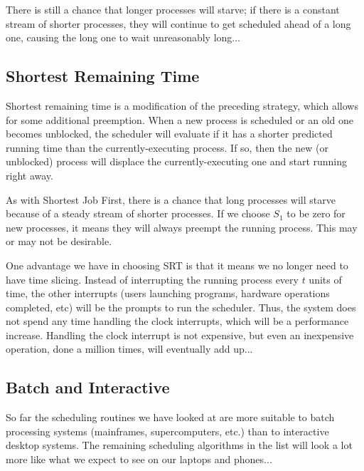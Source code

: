 There is still a chance that longer processes will starve; if there is a constant stream of shorter processes, they will continue to get scheduled ahead of a long one, causing the long one to wait unreasonably long...

\subsection*{Shortest Remaining Time}

Shortest remaining time is a modification of the preceding strategy, which allows for some additional preemption. When a new process is scheduled or an old one becomes unblocked, the scheduler will evaluate if it has a shorter predicted running time than the currently-executing process. If so, then the new (or unblocked) process will displace the currently-executing one and start running right away.

As with Shortest Job First, there is a chance that long processes will starve because of a steady stream of shorter processes. If we choose $S_{1}$ to be zero for new processes, it means they will always preempt the running process. This may or may not be desirable.

One advantage we have in choosing SRT is that it means we no longer need to have time slicing. Instead of interrupting the running process every $t$ units of time, the other interrupts (users launching programs, hardware operations completed, etc) will be the prompts to run the scheduler. Thus, the system does not spend any time handling the clock interrupts, which will be a performance increase. Handling the clock interrupt is not expensive, but even an inexpensive operation, done a million times, will eventually add up...~\cite{osi}

\subsection*{Batch and Interactive}

So far the scheduling routines we have looked at are more suitable to batch processing systems (mainframes, supercomputers, etc.) than to interactive desktop systems. The remaining scheduling algorithms in the list will look a lot more like what we expect to see on our laptops and phones...



